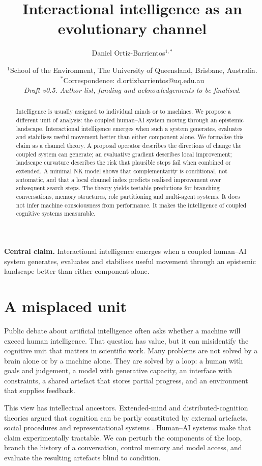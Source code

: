 \documentclass[11pt]{article}
\title{\vspace{-1.5cm}\textbf{Interactional intelligence as an evolutionary channel}}
\author{Daniel Ortiz-Barrientos$^{1,*}$}
\date{\vspace{-0.5em}\small $^1$School of the Environment, The University of Queensland, Brisbane, Australia.\\
$^*$Correspondence: d.ortizbarrientos@uq.edu.au\\[0.6em]
\textit{Draft v0.5. Author list, funding and acknowledgements to be finalised.}}
\begin{document}
\maketitle

\begin{abstract}
\noindent Intelligence is usually assigned to individual minds or to machines. We propose a different unit of analysis: the coupled human--AI system moving through an epistemic landscape. Interactional intelligence emerges when such a system generates, evaluates and stabilises useful movement better than either component alone. We formalise this claim as a channel theory. A proposal operator describes the directions of change the coupled system can generate; an evaluative gradient describes local improvement; landscape curvature describes the risk that plausible steps fail when combined or extended. A minimal NK model shows that complementarity is conditional, not automatic, and that a local channel index predicts realised improvement over subsequent search steps. The theory yields testable predictions for branching conversations, memory structures, role partitioning and multi-agent systems. It does not infer machine consciousness from performance. It makes the intelligence of coupled cognitive systems measurable.
\end{abstract}

\textbf{Central claim.} Interactional intelligence emerges when a coupled human--AI system generates, evaluates and stabilises useful movement through an epistemic landscape better than either component alone.

\section*{A misplaced unit}

Public debate about artificial intelligence often asks whether a machine will exceed human intelligence. That question has value, but it can misidentify the cognitive unit that matters in scientific work. Many problems are not solved by a brain alone or by a machine alone. They are solved by a loop: a human with goals and judgement, a model with generative capacity, an interface with constraints, a shared artefact that stores partial progress, and an environment that supplies feedback.

This view has intellectual ancestors. Extended-mind and distributed-cognition theories argued that cognition can be partly constituted by external artefacts, social procedures and representational systems \cite{Clark1998,Hutchins1995,Hollan2000}. Human--AI systems make that claim experimentally tractable. We can perturb the components of the loop, branch the history of a conversation, control memory and model access, and evaluate the resulting artefacts blind to condition.
\end{document}
